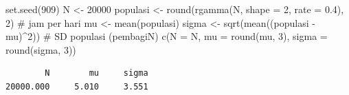 \documentclass[
  indonesian,
  letterpaper,
]{book}
\newenvironment{Shaded}{\begin{snugshade}}{\end{snugshade}}
\newcommand{\AttributeTok}[1]{\textcolor[rgb]{0.40,0.45,0.13}{#1}}
\newcommand{\CommentTok}[1]{\textcolor[rgb]{0.37,0.37,0.37}{#1}}
\newcommand{\DecValTok}[1]{\textcolor[rgb]{0.68,0.00,0.00}{#1}}
\newcommand{\FloatTok}[1]{\textcolor[rgb]{0.68,0.00,0.00}{#1}}
\newcommand{\FunctionTok}[1]{\textcolor[rgb]{0.28,0.35,0.67}{#1}}
\newcommand{\NormalTok}[1]{\textcolor[rgb]{0.00,0.23,0.31}{#1}}
\newcommand{\OtherTok}[1]{\textcolor[rgb]{0.00,0.23,0.31}{#1}}
\newcommand{\SpecialCharTok}[1]{\textcolor[rgb]{0.37,0.37,0.37}{#1}}
\begin{document}
\begin{Shaded}
\begin{Highlighting}[]
\FunctionTok{set.seed}\NormalTok{(}\DecValTok{909}\NormalTok{)}
\NormalTok{N }\OtherTok{\textless{}{-}} \DecValTok{20000}
\NormalTok{populasi }\OtherTok{\textless{}{-}} \FunctionTok{round}\NormalTok{(}\FunctionTok{rgamma}\NormalTok{(N, }\AttributeTok{shape =} \DecValTok{2}\NormalTok{, }\AttributeTok{rate =} \FloatTok{0.4}\NormalTok{), }\DecValTok{2}\NormalTok{) }\CommentTok{\# jam per hari}
\NormalTok{mu }\OtherTok{\textless{}{-}} \FunctionTok{mean}\NormalTok{(populasi)}
\NormalTok{sigma }\OtherTok{\textless{}{-}} \FunctionTok{sqrt}\NormalTok{(}\FunctionTok{mean}\NormalTok{((populasi }\SpecialCharTok{{-}}\NormalTok{ mu)}\SpecialCharTok{\^{}}\DecValTok{2}\NormalTok{)) }\CommentTok{\# SD populasi (pembagiN)}
\FunctionTok{c}\NormalTok{(}\AttributeTok{N =}\NormalTok{ N, }\AttributeTok{mu =} \FunctionTok{round}\NormalTok{(mu, }\DecValTok{3}\NormalTok{), }\AttributeTok{sigma =} \FunctionTok{round}\NormalTok{(sigma, }\DecValTok{3}\NormalTok{))}
\end{Highlighting}
\end{Shaded}

\begin{verbatim}
        N        mu     sigma 
20000.000     5.010     3.551 
\end{verbatim}
\end{document}
